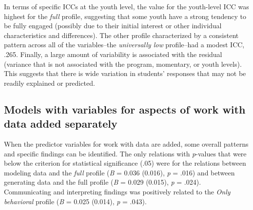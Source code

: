 \documentclass[]{book}
\theoremstyle{definition}
\theoremstyle{definition}
\theoremstyle{definition}
\theoremstyle{remark}
\begin{document}
In terms of specific ICCs at the youth level, the value for the
youth-level ICC was highest for the \emph{full} profile, suggesting that
some youth have a strong tendency to be fully engaged (possibly due to
their initial interest or other individual characteristics and
differences). The other profile characterized by a consistent pattern
across all of the variables--the \emph{universally low} profile--had a
modest ICC, .265. Finally, a large amount of variability is associated
with the residual (variance that is not associated with the program,
momentary, or youth levels). This suggests that there is wide variation
in students' responses that may not be readily explained or predicted.

\subsection{Models with variables for aspects of work with data added
separately}\label{models-with-variables-for-aspects-of-work-with-data-added-separately}

When the predictor variables for work with data are added, some overall
patterns and specific findings can be identified. The only relations
with \emph{p}-values that were below the criterion for statistical
significance (.05) were for the relations between modeling data and the
\emph{full} profile (\emph{B} = 0.036 (0.016), \emph{p} = .016) and
between generating data and the full profile (\emph{B} = 0.029 (0.015),
\emph{p} = .024). Communicating and interpreting findings was positively
related to the \emph{Only behavioral} profile (\emph{B} = 0.025 (0.014),
\emph{p} = .043).
\end{document}
